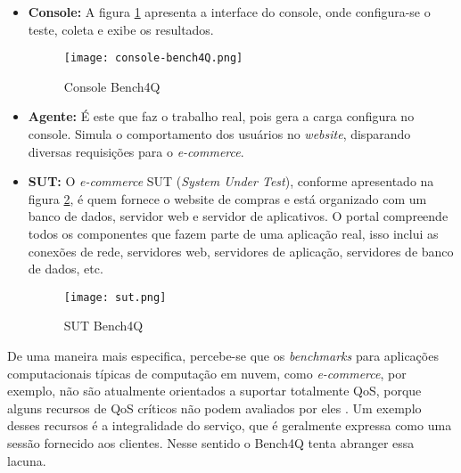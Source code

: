 \begin{itemize}
	
	\item \textbf{Console:} A figura \ref{fig:console-bench4q} apresenta a interface do console, onde configura-se o teste, coleta e exibe os resultados. 
	
	\begin{figure}[!htb]
		\centering
		\texttt{[image: console-bench4Q.png]}
		\caption{Console Bench4Q}
		\label{fig:console-bench4q}
	\end{figure}
	
	\item \textbf{Agente:} É este que faz o trabalho real, pois gera a carga configura no console. Simula o comportamento dos usuários no \textit{website}, disparando diversas requisições para o \textit{e-commerce}. 
	
	\item \textbf{SUT:} O \textit{e-commerce} SUT (\textit{System Under Test}), conforme apresentado na figura \ref{fig:sut},  é quem fornece o website de compras e está organizado com um banco de dados, servidor web e servidor de aplicativos. O portal compreende todos os componentes que fazem parte de uma aplicação real, isso inclui as conexões de rede, servidores web, servidores de aplicação, servidores de banco de dados, etc.
	
	\begin{figure}[htb]
		\centering
		\texttt{[image: sut.png]}
		\caption{SUT Bench4Q}
		\label{fig:sut}
	\end{figure}
	
\end{itemize}

De uma maneira mais especifica, percebe-se que os \textit{benchmarks} para aplicações computacionais típicas de computação em nuvem, como \textit{e-commerce}, por exemplo, não são atualmente orientados a suportar totalmente QoS, porque alguns recursos de QoS críticos não podem avaliados por eles \cite{Zhang2011}. Um exemplo desses recursos é a integralidade do serviço, que é geralmente expressa como uma sessão fornecido aos clientes. Nesse sentido o Bench4Q tenta abranger essa lacuna.


